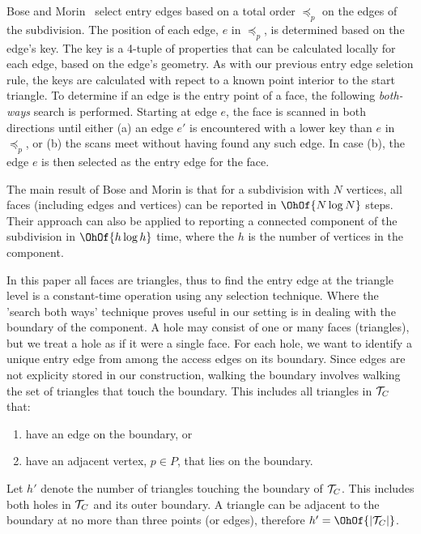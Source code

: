 {  Bose and Morin~\cite{DBLP:conf/isaac/BoseM00} select entry edges based 
  on a total order $\preceq_p$ on the edges of the subdivision. 
  The position of each edge, $e$ in $\preceq_p$, is determined based on 
  the edge's key. 
  The key is a 4-tuple of properties that can be calculated locally for 
  each edge, based on the edge's geometry. 
  As with our previous entry edge seletion rule, the keys are calculated 
  with repect to a known point interior to the start triangle.
  To determine if an edge is the entry point of a face, the following 
  \emph{both-ways} search is performed.
  Starting at edge $e$, the face is scanned in both directions 
  until either (a) an edge $e'$ is encountered with 
  a lower key than $e$ in $\preceq_p$, or (b) the scans meet without 
  having found any such edge.  
  In case (b), the edge $e$ is then selected as the entry edge for 
  the face.

  The main result of Bose and Morin is that for a subdivision 
  with $N$ vertices, all faces (including edges and vertices) can be 
  reported in $\OhOf{N \log{N}}$ steps. 
  Their approach can also be applied to reporting a connected 
  component of the subdivision in $\OhOf{h \log{h}}$ time, where the 
  $h$ is the number of vertices in the component.  

  In this paper all faces are triangles, thus to find the entry edge
  at the triangle level is a constant-time operation using any
  selection technique.
  Where the 'search both ways' technique proves useful in our setting 
  is in dealing with the boundary of the component. 
  A hole may consist of 
  one or many faces (triangles), but we treat a hole as if it were a 
  single face.
  For each hole, we want to identify a unique entry edge from among
  the access edges on its boundary.
  Since edges are not explicity stored in our construction, walking
  the boundary involves walking the set of triangles that touch the boundary. 
  This includes all triangles in ${\mathcal{T}}_C$ that:
  
  \begin{enumerate}
  \item have an edge on the boundary, or
  \item have an adjacent vertex, $p \in P$, that lies on the boundary.
  \end{enumerate}
  
  Let $h'$ denote the number of triangles touching the boundary of
  ${\mathcal{T}}_C$. 
  This includes both holes in ${\mathcal{T}}_C$ and its outer boundary.
  A triangle can be adjacent to the boundary at no more than three 
  points (or edges), therefore $h' = \OhOf{|\concomp|}$. 
  
}
